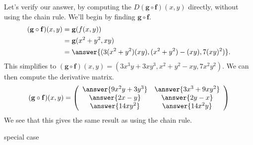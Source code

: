\documentclass{ximera}
\begin{document}
\begin{example}
Let's verify our answer, by computing the $D(\mathbf{g}\circ\mathbf{f})(x,y)$ directly, without using the chain rule. We'll begin by finding $\mathbf{g}\circ\mathbf{f}$.
\begin{align*}
(\mathbf{g}\circ\mathbf{f})(x,y) &= \mathbf{g}(f(x,y))\\
&= \mathbf{g}(x^2+y^2,xy)\\
&= \answer{(3(x^2+y^2)(xy),(x^2+y^2)-(xy),7(xy)^2)}.
\end{align*}
This simplifies to $(\mathbf{g}\circ\mathbf{f})(x,y) = (3x^3y+3xy^3, x^2+y^2-xy,7x^2y^2)$. We can then compute the derivative matrix.
\[
(\mathbf{g}\circ\mathbf{f})(x,y) =  \left(\begin{array}{cc}\answer{9x^2y+3y^3} & \answer{3x^3+9xy^2}\\\answer{2x-y} & \answer{2y-x}\\\answer{14xy^2} & \answer{14x^2y}\end{array}\right)
\]
We see that this gives the same result as using the chain rule.
\end{example}

\begin{example}
special case
\end{example}
\end{document}
